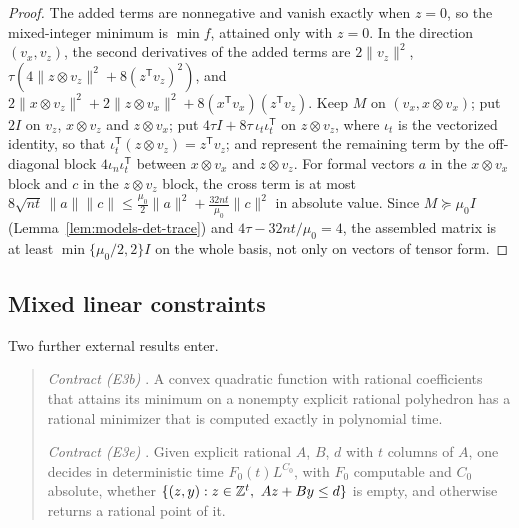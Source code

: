 \begin{proof}
The added terms are nonnegative and vanish exactly when $z=0$, so the
mixed-integer minimum is $\min f$, attained only with $z=0$. In the direction
$(v_x,v_z)$, the second derivatives of the added terms are
$2\|v_z\|^2$, $\tau(4\|z\otimes v_z\|^2+8(z^{\mathsf T}v_z)^2)$, and
$2\|x\otimes v_z\|^2+2\|z\otimes v_x\|^2+8(x^{\mathsf T}v_x)(z^{\mathsf T}v_z)$.
Keep $M$ on $(v_x,x\otimes v_x)$; put $2I$ on $v_z$, $x\otimes v_z$ and
$z\otimes v_x$; put $4\tau I+8\tau\,\iota_t\iota_t^{\mathsf T}$ on $z\otimes v_z$,
where $\iota_t$ is the vectorized identity, so that
$\iota_t^{\mathsf T}(z\otimes v_z)=z^{\mathsf T}v_z$; and represent the
remaining term by the off-diagonal block $4\iota_n\iota_t^{\mathsf T}$ between
$x\otimes v_x$ and $z\otimes v_z$. For formal vectors $a$ in the
$x\otimes v_x$ block and $c$ in the $z\otimes v_z$ block, the cross term is at
most $8\sqrt{nt}\,\|a\|\|c\|\le\frac{\mu_0}2\|a\|^2+\frac{32nt}{\mu_0}\|c\|^2$
in absolute value. Since $M\succeq\mu_0I$
(Lemma~\ref{lem:models-det-trace}) and $4\tau-32nt/\mu_0=4$, the assembled
matrix is at least $\min\{\mu_0/2,2\}I$ on the whole basis, not only on
vectors of tensor form.
\end{proof}

\subsection{Mixed linear constraints}
\label{app:constraints-mixed}

Two further external results enter.

\begin{quote}
\emph{Contract (E3b)} \citep{KozlovTarasovKhachiyan1980}. A convex quadratic
function with rational coefficients that attains its minimum on a nonempty
explicit rational polyhedron has a rational minimizer that is computed exactly
in polynomial time.

\emph{Contract (E3e)} \citep[Theorem~3, applied with the zero
objective]{DelPia2023}. Given explicit rational $A$, $B$, $d$ with $t$ columns
of $A$, one decides in deterministic time $F_0(t)L^{C_0}$, with $F_0$
computable and $C_0$ absolute, whether
$\{(z,y):z\in\mathbb Z^t,\ Az+By\le d\}$ is empty, and otherwise returns a rational
point of it.
\end{quote}

